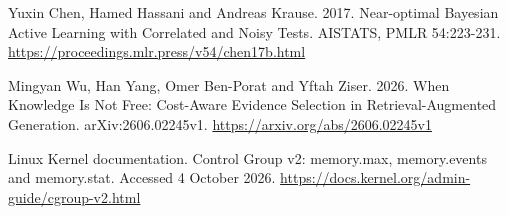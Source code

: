\documentclass[10pt,a4paper]{article}
\begin{document}
Yuxin Chen, Hamed Hassani and Andreas Krause. 2017. Near-optimal Bayesian Active Learning with Correlated and Noisy Tests. AISTATS, PMLR 54:223-231. \url{https://proceedings.mlr.press/v54/chen17b.html}

Mingyan Wu, Han Yang, Omer Ben-Porat and Yftah Ziser. 2026. When Knowledge Is Not Free: Cost-Aware Evidence Selection in Retrieval-Augmented Generation. arXiv:2606.02245v1. \url{https://arxiv.org/abs/2606.02245v1}

Linux Kernel documentation. Control Group v2: memory.max, memory.events and memory.stat. Accessed 4 October 2026. \url{https://docs.kernel.org/admin-guide/cgroup-v2.html}
\end{document}
